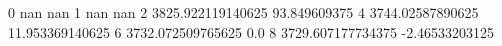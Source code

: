 0 nan nan
1 nan nan
2 3825.922119140625 93.849609375
4 3744.02587890625 11.953369140625
6 3732.072509765625 0.0
8 3729.607177734375 -2.46533203125
